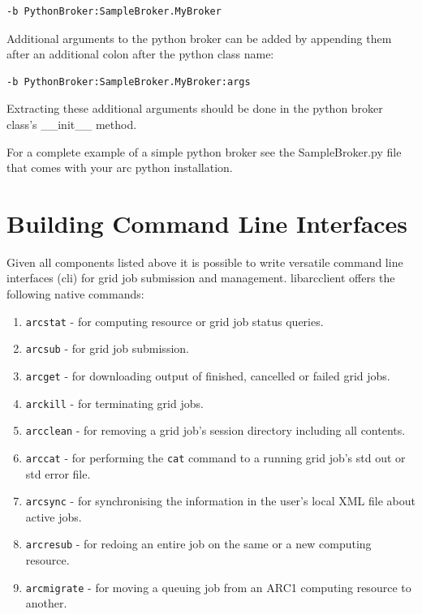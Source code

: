 \documentclass{book}
\newcommand{\libarcclient}{libarcclient}
\begin{document}
\begin{shaded}
\begin{verbatim}
-b PythonBroker:SampleBroker.MyBroker
\end{verbatim}
\end{shaded}

Additional arguments to the python broker can be added by appending
them after an additional colon after the python class name:

\begin{shaded}
\begin{verbatim}
-b PythonBroker:SampleBroker.MyBroker:args
\end{verbatim}
\end{shaded}

Extracting these additional arguments should be done in the python
broker class's \_\_init\_\_ method.

For a complete example of a simple python broker see the
SampleBroker.py file that comes with your arc python installation.

\chapter{Building Command Line Interfaces}
\label{sec:cli}

Given all components listed above it is possible to write versatile
command line interfaces (cli) for grid job submission and
management. {\libarcclient} offers the following native commands:

\begin{enumerate}
\item{\texttt{arcstat} - for computing resource or grid job status
  queries.}
\item{\texttt{arcsub} - for grid job submission.}
\item{\texttt{arcget} - for downloading output of finished, cancelled
  or failed grid jobs.}
\item{\texttt{arckill} - for terminating grid jobs.}
\item{\texttt{arcclean} - for removing a grid job's session directory
  including all contents.}
\item{\texttt{arccat} - for performing the \texttt{cat} command to a
  running grid job's std out or std error file.}
\item{\texttt{arcsync} - for synchronising the information in the user's
  local XML file about active jobs.}
\item{\texttt{arcresub} - for redoing an entire job on the same or a new
  computing resource.}
\item{\texttt{arcmigrate} - for moving a queuing job from an ARC1 
  computing resource to another.}
\end{enumerate}
\end{document}
